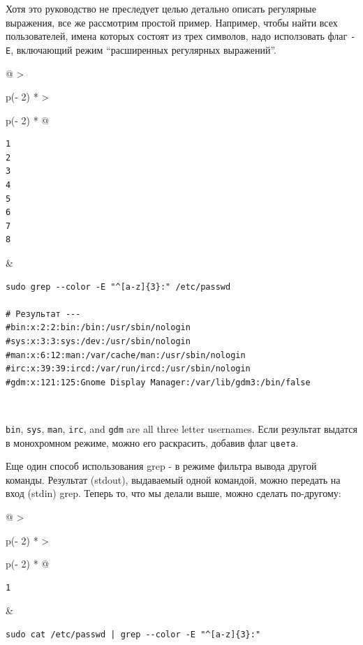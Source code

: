 \documentclass{article}
\begin{document}
Хотя это руководство не преследует целью детально описать регулярные
выражения, все же рассмотрим простой пример. Например, чтобы найти всех
пользователей, имена которых состоят из трех символов, надо исползовать
флаг \texttt{-E}, включающий режим ``расширенных регулярных выражений''.

\begin{longtable}[]{@{}
  >{\raggedright\arraybackslash}p{(\columnwidth - 2\tabcolsep) * }
  >{\raggedright\arraybackslash}p{(\columnwidth - 2\tabcolsep) * }@{}}
\toprule
\endhead
\begin{minipage}[t]{\linewidth}\raggedright
\begin{verbatim}
1
2
3
4
5
6
7
8
\end{verbatim}
\end{minipage} & \begin{minipage}[t]{\linewidth}\raggedright
\begin{verbatim}
sudo grep --color -E "^[a-z]{3}:" /etc/passwd

# Результат ---
#bin:x:2:2:bin:/bin:/usr/sbin/nologin
#sys:x:3:3:sys:/dev:/usr/sbin/nologin
#man:x:6:12:man:/var/cache/man:/usr/sbin/nologin
#irc:x:39:39:ircd:/var/run/ircd:/usr/sbin/nologin
#gdm:x:121:125:Gnome Display Manager:/var/lib/gdm3:/bin/false
\end{verbatim}
\end{minipage} \\ \addlinespace
\bottomrule
\end{longtable}

\texttt{bin}, \texttt{sys}, \texttt{man}, \texttt{irc}, and \texttt{gdm}
are all three letter usernames. Если результат выдатся в монохромном
режиме, можно его раскрасить, добавив флаг \texttt{цвета}.

Еще один способ использования grep - в режиме фильтра вывода другой
команды. Результат (stdout), выдаваемый одной командой, можно передать
на вход (stdin) grep. Теперь то, что мы делали выше, можно сделать
по-другому:

\begin{longtable}[]{@{}
  >{\raggedright\arraybackslash}p{(\columnwidth - 2\tabcolsep) * }
  >{\raggedright\arraybackslash}p{(\columnwidth - 2\tabcolsep) * }@{}}
\toprule
\endhead
\begin{minipage}[t]{\linewidth}\raggedright
\begin{verbatim}
1
\end{verbatim}
\end{minipage} & \begin{minipage}[t]{\linewidth}\raggedright
\begin{verbatim}
sudo cat /etc/passwd | grep --color -E "^[a-z]{3}:"
\end{verbatim}
\end{minipage} \\ \addlinespace
\bottomrule
\end{longtable}
\end{document}
